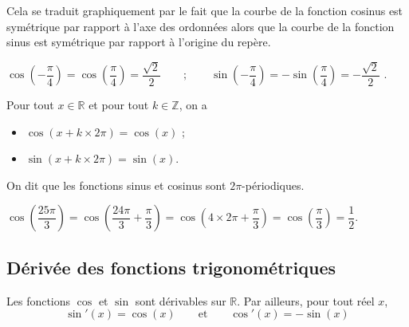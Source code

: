 \documentclass[11pt,fleqn, openany]{book} %
\begin{document}
Cela se traduit graphiquement par le fait que la courbe de la fonction cosinus est symétrique par rapport à l'axe des ordonnées alors que la courbe de la fonction sinus est symétrique par rapport à l'origine du repère.

\begin{example}
$\cos \left( -\dfrac{\pi}{4} \right) = \cos \left( \dfrac{\pi}{4} \right)= \dfrac{\sqrt{2}}{2}\qquad ; \qquad \sin \left( -\dfrac{\pi}{4} \right) = -\sin \left( \dfrac{\pi}{4} \right)= -\dfrac{\sqrt{2}}{2}$ .
\end{example}

\begin{proposition}Pour tout $x\in\mathbb{R}$ et pour tout $k\in\mathbb{Z}$, on a
\begin{itemize}
\item $\cos (x+k\times 2\pi)=\cos (x)$ ;
\item $\sin (x+k\times 2\pi) = \sin (x)$.
\end{itemize}
On dit que les fonctions sinus et cosinus sont $2\pi$-périodiques. \end{proposition}

\begin{example}
$\cos \left( \dfrac{25\pi}{3}\right)= \cos \left( \dfrac{24\pi}{3}+\dfrac{\pi}{3}\right)=\cos \left(4\times 2\pi + \dfrac{\pi}{3}\right)=\cos\left( \dfrac{\pi}{3}\right)=\dfrac{1}{2}$.
\end{example}

\subsection{Dérivée des fonctions trigonométriques}

\begin{proposition}Les fonctions $\cos$ et $\sin$ sont dérivables sur $\mathbb{R}$. Par ailleurs, pour tout réel $x$,
\[\sin'(x)=\cos(x) \qquad \text{et}\qquad \cos'(x)=-\sin(x)\]
\vspace{-0.5cm}\end{proposition}
\end{document}
